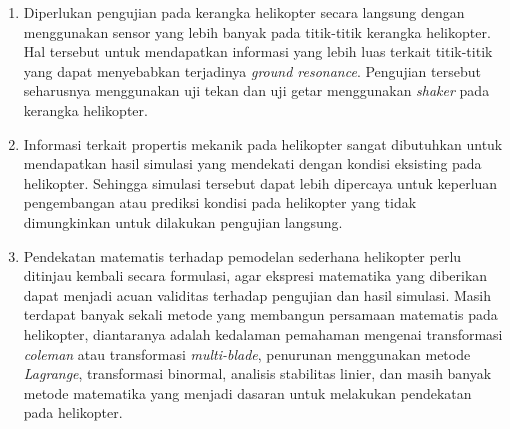 \begin{enumerate}[nolistsep]

  \item Diperlukan pengujian pada kerangka helikopter secara langsung dengan menggunakan sensor yang lebih banyak pada titik-titik kerangka helikopter. Hal tersebut untuk mendapatkan informasi yang lebih luas terkait titik-titik yang dapat menyebabkan terjadinya \textit{ground resonance}. Pengujian tersebut seharusnya menggunakan uji tekan dan uji getar menggunakan \textit{shaker} pada kerangka helikopter.

  \item Informasi terkait propertis mekanik pada helikopter sangat dibutuhkan untuk mendapatkan hasil simulasi yang mendekati dengan kondisi eksisting pada helikopter. Sehingga simulasi tersebut dapat lebih dipercaya untuk keperluan pengembangan atau prediksi kondisi pada helikopter yang tidak dimungkinkan untuk dilakukan pengujian langsung.

  \item Pendekatan matematis terhadap pemodelan sederhana helikopter perlu ditinjau kembali secara formulasi, agar ekspresi matematika yang diberikan dapat menjadi acuan validitas terhadap pengujian dan hasil simulasi. Masih terdapat banyak sekali metode yang membangun persamaan matematis pada helikopter, diantaranya adalah kedalaman pemahaman mengenai transformasi \textit{coleman} atau transformasi \textit{multi-blade}, penurunan menggunakan metode \textit{Lagrange}, transformasi binormal, analisis stabilitas linier, dan masih banyak metode matematika yang menjadi dasaran untuk melakukan pendekatan pada helikopter.

\end{enumerate}
